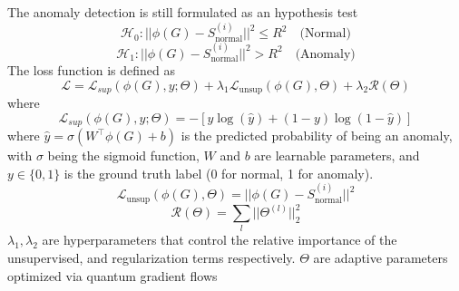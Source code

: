 The anomaly detection is still formulated as an hypothesis test
\begin{equation}
    \mathcal{H}_{0}: ||\phi(G) - S_\text{normal}^{(i)}||^2 \le R^2 \quad \text{(Normal)}
\end{equation}
\begin{equation}
    \mathcal{H}_{1}: ||\phi(G) - S_\text{normal}^{(i)}||^2 > R^2 \quad \text{(Anomaly)}
\end{equation}
The loss function is defined as
\begin{equation}
    \mathcal{L} = \mathcal{L}_{sup}(\phi(G), y; \Theta) + \lambda_{1} \mathcal{L}_\text{unsup}(\phi(G), \Theta) + \lambda_{2}\mathcal{R}(\Theta)
\end{equation}
where
\begin{equation}
    \mathcal{L}_{sup}(\phi(G), y; \Theta) = - \left[ y \log(\hat{y}) + (1 - y) \log(1 - \hat{y}) \right]
\end{equation}
where \(\hat{y} = \sigma(W^\top \phi(G) + b)\) is the predicted probability of being an anomaly, with \(\sigma\) being the sigmoid function, \(W\) and \(b\) are learnable parameters, and \(y \in \{0, 1\}\) is the ground truth label (0 for normal, 1 for anomaly).
\begin{equation}
    \mathcal{L}_\text{unsup}(\phi(G), \Theta) = ||\phi(G) - S_\text{normal}^{(i)}||^2
\end{equation}
\begin{equation}
    \mathcal{R}(\Theta)=\sum_{l}||\Theta^{(l)}||_{2}^{2}
\end{equation}
\(\lambda_1, \lambda_2\) are hyperparameters that control the relative importance of the unsupervised, and regularization terms respectively.
\(\Theta\) are adaptive parameters optimized via quantum gradient flows
